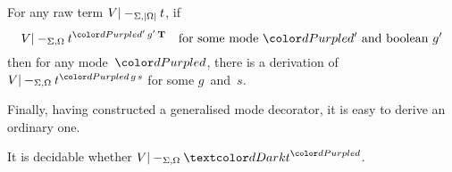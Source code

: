 \begin{lemma}\label{thm:adjustment}
For any raw term $V |-_{\Sigma,\left|\Omega\right|} t$, if
\begin{equation}\label{eq:strict-derivation}
V |-_{\Sigma,\Omega} t^{\dir{d'}\,g'\,\BTrue} \quad\text{for some mode~$\dir{d'}$ and boolean~$g'$}
\end{equation}
then for any mode~$\dir{d}$, there is a derivation of\/ $V |-_{\Sigma,\Omega} t^{\dir{d}\,g\,s}$ for some $g$~and~$s$.
\end{lemma}


%

Finally, having constructed a generalised mode decorator, it is easy to derive an ordinary one.

\begin{corollary}\label{thm:mode-decoration}
  It is decidable whether $V |-_{\Sigma,\Omega} \isTerm{t}^\dir{d}$.%
\end{corollary}


